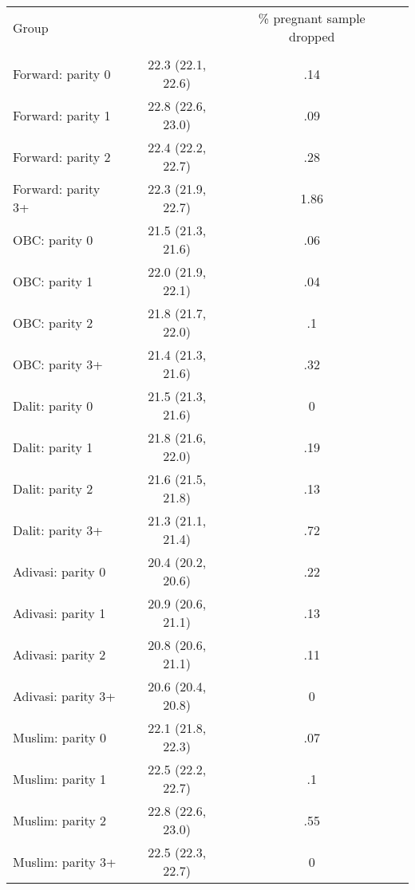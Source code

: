 \begin{tabular}{lccc}
\toprule
Group &  & \% pregnant sample dropped \\\\
\midrule
Forward: parity 0&22.3 (22.1, 22.6)&.14\\
Forward: parity 1&22.8 (22.6, 23.0)&.09\\
Forward: parity 2&22.4 (22.2, 22.7)&.28\\
Forward: parity 3+&22.3 (21.9, 22.7)&1.86\\
OBC: parity 0&21.5 (21.3, 21.6)&.06\\
OBC: parity 1&22.0 (21.9, 22.1)&.04\\
OBC: parity 2&21.8 (21.7, 22.0)&.1\\
OBC: parity 3+&21.4 (21.3, 21.6)&.32\\
Dalit: parity 0&21.5 (21.3, 21.6)&0\\
Dalit: parity 1&21.8 (21.6, 22.0)&.19\\
Dalit: parity 2&21.6 (21.5, 21.8)&.13\\
Dalit: parity 3+&21.3 (21.1, 21.4)&.72\\
Adivasi: parity 0&20.4 (20.2, 20.6)&.22\\
Adivasi: parity 1&20.9 (20.6, 21.1)&.13\\
Adivasi: parity 2&20.8 (20.6, 21.1)&.11\\
Adivasi: parity 3+&20.6 (20.4, 20.8)&0\\
Muslim: parity 0&22.1 (21.8, 22.3)&.07\\
Muslim: parity 1&22.5 (22.2, 22.7)&.1\\
Muslim: parity 2&22.8 (22.6, 23.0)&.55\\
Muslim: parity 3+&22.5 (22.3, 22.7)&0\\
\bottomrule
\end{tabular}
